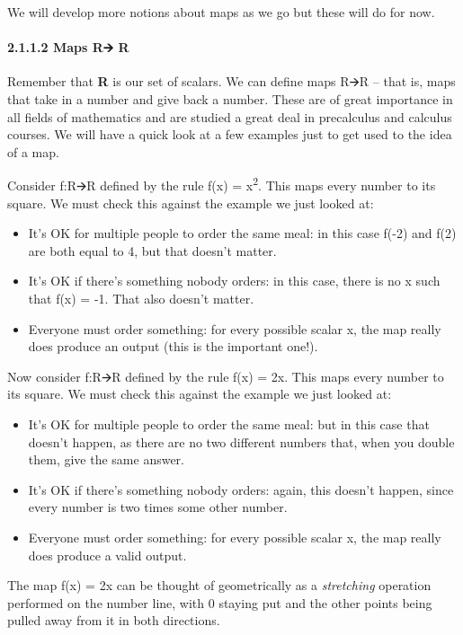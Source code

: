 \documentclass[oneside,english]{amsbook}
\numberwithin{section}{chapter}
\theoremstyle{plain}
\theoremstyle{definition}
\begin{document}
We will develop more notions about maps as we go but these will do for
now.

\paragraph{2.1.1.2 Maps R🡪 R}\label{maps-r-r}

Remember that \textbf{R} is our set of scalars. We can define maps R🡪R
-- that is, maps that take in a number and give back a number. These are
of great importance in all fields of mathematics and are studied a great
deal in precalculus and calculus courses. We will have a quick look at a
few examples just to get used to the idea of a map.

Consider f:R🡪R defined by the rule f(x) = x\textsuperscript{2}. This
maps every number to its square. We must check this against the example
we just looked at:

\begin{itemize}
	\item
	It's OK for multiple people to order the same meal: in this case f(-2)
	and f(2) are both equal to 4, but that doesn't matter.
	\item
	It's OK if there's something nobody orders: in this case, there is no
	x such that f(x) = -1. That also doesn't matter.
	\item
	Everyone must order something: for every possible scalar x, the map
	really does produce an output (this is the important one!).
\end{itemize}

Now consider f:R🡪R defined by the rule f(x) = 2x. This maps every number
to its square. We must check this against the example we just looked at:

\begin{itemize}
	\item
	It's OK for multiple people to order the same meal: but in this case
	that doesn't happen, as there are no two different numbers that, when
	you double them, give the same answer.
	\item
	It's OK if there's something nobody orders: again, this doesn't
	happen, since every number is two times some other number.
	\item
	Everyone must order something: for every possible scalar x, the map
	really does produce a valid output.
\end{itemize}

The map f(x) = 2x can be thought of geometrically as a \emph{stretching}
operation performed on the number line, with 0 staying put and the other
points being pulled away from it in both directions.
\end{document}
